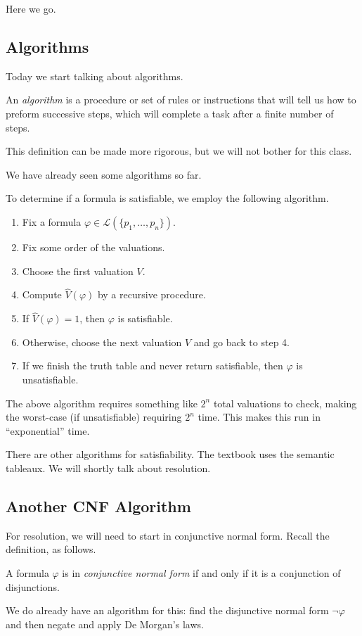 \documentclass[../notes.tex]{subfiles}
\begin{document}

Here we go.

\subsection{Algorithms}
Today we start talking about algorithms.
\begin{definition}[Algorithm]
	An \textit{algorithm} is a procedure or set of rules or instructions that will tell us how to preform successive steps, which will complete a task after a finite number of steps.
\end{definition}
This definition can be made more rigorous, but we will not bother for this class.

We have already seen some algorithms so far.
\begin{example}
	To determine if a formula is satisfiable, we employ the following algorithm.
	\begin{enumerate}
		\item Fix a formula $\varphi\in\mathcal L(\{p_1,\ldots,p_n\})$.
		\item Fix some order of the valuations.
		\item Choose the first valuation $V$.
		\item Compute $\hat V(\varphi)$ by a recursive procedure.
		\item If $\hat V(\varphi)=1$, then $\varphi$ is satisfiable.
		\item Otherwise, choose the next valuation $V$ and go back to step 4.
		\item If we finish the truth table and never return satisfiable, then $\varphi$ is unsatisfiable.
	\end{enumerate}
\end{example}
\begin{remark}
	The above algorithm requires something like $2^n$ total valuations to check, making the worst-case (if unsatisfiable) requiring $2^n$ time. This makes this run in ``exponential'' time.
\end{remark}
\begin{remark}
	There are other algorithms for satisfiability. The textbook uses the semantic tableaux. We will shortly talk about resolution.
\end{remark}

\subsection{Another CNF Algorithm}
For resolution, we will need to start in conjunctive normal form. Recall the definition, as follows.
\begin{definition}
	A formula $\varphi$ is in \textit{conjunctive normal form} if and only if it is a conjunction of disjunctions.
\end{definition}
We do already have an algorithm for this: find the disjunctive normal form $\lnot\varphi$ and then negate and apply De Morgan's laws.
\end{document}
